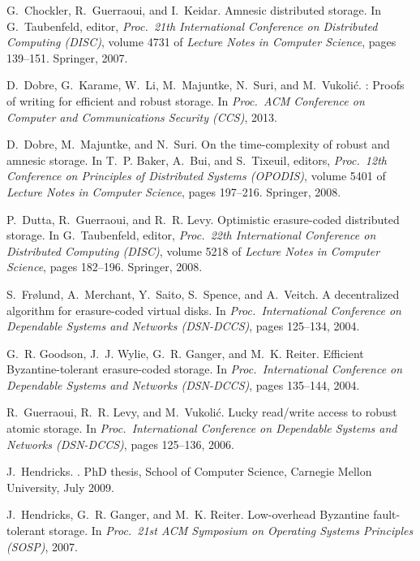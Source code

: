 \documentclass[oribibl]{llncs}
\theoremstyle{definition-boldhead}
\begin{document}
\begin{thebibliography}{10}
G.~Chockler, R.~Guerraoui, and I.~Keidar.
\newblock Amnesic distributed storage.
\newblock In G.~Taubenfeld, editor, {\em Proc.\ 21th International Conference
  on Distributed Computing (DISC)}, volume 4731 of {\em Lecture Notes in
  Computer Science}, pages 139--151. Springer, 2007.

D.~Dobre, G.~Karame, W.~Li, M.~Majuntke, N.~Suri, and M.~Vukoli\'{c}.
: Proofs of writing for efficient and robust storage.
\newblock In {\em Proc.\ ACM Conference on Computer and Communications Security
  (CCS)}, 2013.

D.~Dobre, M.~Majuntke, and N.~Suri.
\newblock On the time-complexity of robust and amnesic storage.
\newblock In T.~P. Baker, A.~Bui, and S.~Tixeuil, editors, {\em Proc.\ 12th
  Conference on Principles of Distributed Systems (OPODIS)}, volume 5401 of
  {\em Lecture Notes in Computer Science}, pages 197--216. Springer, 2008.

P.~Dutta, R.~Guerraoui, and R.~R. Levy.
\newblock Optimistic erasure-coded distributed storage.
\newblock In G.~Taubenfeld, editor, {\em Proc.\ 22th International Conference
  on Distributed Computing (DISC)}, volume 5218 of {\em Lecture Notes in
  Computer Science}, pages 182--196. Springer, 2008.

S.~{Fr\o{}lund}, A.~Merchant, Y.~Saito, S.~Spence, and A.~Veitch.
\newblock A decentralized algorithm for erasure-coded virtual disks.
\newblock In {\em Proc.\ International Conference on Dependable Systems and
  Networks (DSN-DCCS)}, pages 125--134, 2004.

G.~R. Goodson, J.~J. Wylie, G.~R. Ganger, and M.~K. Reiter.
\newblock Efficient {Byzantine}-tolerant erasure-coded storage.
\newblock In {\em Proc.\ International Conference on Dependable Systems and
  Networks (DSN-DCCS)}, pages 135--144, 2004.

R.~Guerraoui, R.~R. Levy, and M.~Vukoli\'{c}.
\newblock Lucky read/write access to robust atomic storage.
\newblock In {\em Proc.\ International Conference on Dependable Systems and
  Networks (DSN-DCCS)}, pages 125--136, 2006.

J.~Hendricks.
.
\newblock PhD thesis, School of Computer Science, Carnegie Mellon University,
  July 2009.

J.~Hendricks, G.~R. Ganger, and M.~K. Reiter.
\newblock Low-overhead {Byzantine} fault-tolerant storage.
\newblock In {\em Proc.\ 21st ACM Symposium on Operating Systems Principles
  (SOSP)}, 2007.


\end{thebibliography}
\end{document}

